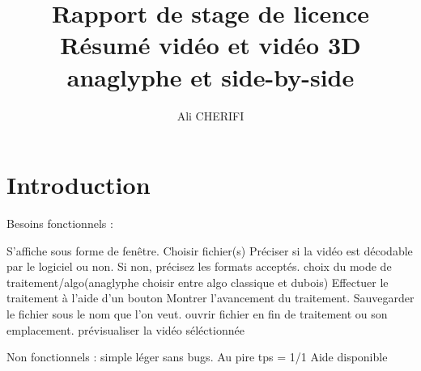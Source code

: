 \documentclass[10pt,a4paper]{article}
\author{Ali CHERIFI}
\title{Rapport de stage de licence\\Résumé vidéo et vidéo 3D anaglyphe et side-by-side}
\begin{document}
\maketitle
\newpage

\section{Introduction}





Besoins fonctionnels : 

S'affiche sous forme de fenêtre.
Choisir fichier(s)
Préciser si la vidéo est décodable par le logiciel ou non. Si non, précisez les formats acceptés.
choix du mode de traitement/algo(anaglyphe choisir entre algo classique et dubois)
Effectuer le traitement à l'aide d'un bouton
Montrer l'avancement du traitement.
Sauvegarder le fichier sous le nom que l'on veut.
ouvrir fichier en fin de traitement ou son emplacement.
prévisualiser la vidéo séléctionnée

Non fonctionnels :
simple
léger
sans bugs.
Au pire tps = 1/1
Aide disponible 
\end{document}
